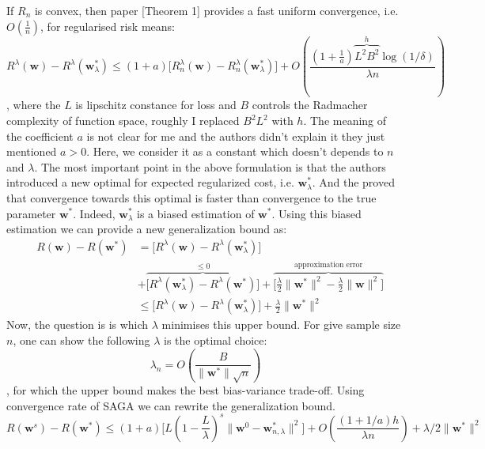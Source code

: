 \documentclass[11pt, a4paper, reqno, twoside]{scrartcl}
\theoremstyle{style}
\newcommand{\wv}{\bm{w}}
\newcommand{\0}{\mathbf{0}} %
\begin{document}
If $R_n$ is convex, then paper \cite{sridharan2009fast} [Theorem 1]
provides a fast uniform convergence, i.e. $O(\frac{1}{n})$, for regularised risk
means: 
\begin{equation}
	R^{\lambda}(\wv) - R^{\lambda} (\wv_{\lambda}^*) \leq
	(1+a)\bigg[R_n^{\lambda}(\wv) - R_n^{\lambda}(\wv_{\lambda}^*)\bigg] +
	O(\frac{(1+\frac{1}{a})\overbrace{L^2 B^2}^{h} \log(1/\delta)}{\lambda n})
	\label{eqn:regularized_generalization_bound}
\end{equation}
, where the $L$ is lipschitz constance for loss and $B$ controls the Radmacher
complexity of function space, roughly I replaced $B^2 L^2$ with $h$.
The meaning of the coefficient $a$ is not clear for me and the authors didn't
explain it they just mentioned $a>0$. Here, we consider it as a constant which
doesn't depends to $n$ and $\lambda$. 
The most important point in the above formulation is that the authors introduced
a new optimal for expected regularized cost, i.e. $\wv_{\lambda}^*$. And the
proved that convergence towards this optimal is faster than convergence to the
true parameter $\wv^*$. Indeed, $\wv^*_{\lambda}$ is a biased estimation of
$\wv^*$. Using this biased estimation we can provide a new generalization bound
as:
\begin{eqnarray*}
	& R(\wv) - R(\wv^*) & = \bigg[ R^{\lambda}(\wv) -
	R^{\lambda}(\wv^*_{\lambda})\bigg] 
	\\
	& & + \overbrace{\bigg[ R^{\lambda}(\wv^*_{\lambda}) - R^{\lambda}(\wv^*) 
	\bigg]}^{\leq 0} + \overbrace{\bigg[ \frac{\lambda}{2} \| \wv^*\|^2  -
	\frac{\lambda}{2} \|\wv\|^2\bigg]}^{\text{approximation error}} \\ 
	& & \leq \bigg[ R^{\lambda}(\wv) -
	R^{\lambda}(\wv^*_{\lambda})\bigg]  +  \frac{\lambda}{2} \| \wv^*\|^2 
\end{eqnarray*}
Now, the question is is which $\lambda$ minimises this upper bound. For give
sample size $n$, one can show the following $\lambda$ is the optimal choice: 
\begin{equation*}
	\lambda_n = O(\frac{B}{\|\wv^*\| \sqrt{n}})
\end{equation*}
, for which the upper bound makes the best bias-variance trade-off. Using
convergence rate of SAGA we can rewrite the generalization bound. 
\begin{equation*}
	R(\wv^s) - R(\wv^*) \leq (1+a)\bigg[ L (1-\frac{L}{\lambda})^s \|\wv^0 -
	\wv^*_{n,\lambda} \|^2 \bigg] + O(\frac{(1+1/a)h}{\lambda n}) + \lambda/2
	\|\wv^*\|^2
\end{equation*}
\end{document}
